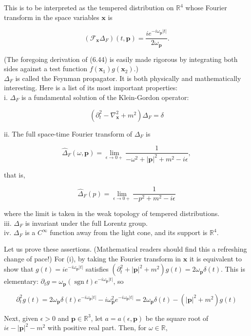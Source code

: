 \documentclass[10pt, letterpaper]{article}
\begin{document}
This is to be interpreted as the tempered distribution on $\mathbb{R}^{4}$ whose Fourier transform in the space variables $\mathbf{x}$ is

$$
\left(\mathcal{F}_{\mathbf{x}} \Delta_{F}\right)(t, \mathbf{p})=\frac{i e^{-i \omega_{\mathbf{p}}|t|}}{2 \omega_{\mathbf{p}}} .
$$

(The foregoing derivation of (6.44) is easily made rigorous by integrating both sides against a test function $f\left(\mathbf{x}_{1}\right) g\left(\mathbf{x}_{2}\right)$.)\\
$\Delta_{F}$ is called the Feynman propagator. It is both physically and mathematically interesting. Here is a list of its most important properties:\\
i. $\Delta_{F}$ is a fundamental solution of the Klein-Gordon operator:

$$
\left(\partial_{t}^{2}-\nabla_{\mathbf{x}}^{2}+m^{2}\right) \Delta_{F}=\delta
$$

ii. The full space-time Fourier transform of $\Delta_{F}$ is

$$
\widehat{\Delta}_{F}(\omega, \mathbf{p})=\lim _{\epsilon \rightarrow 0+} \frac{1}{-\omega^{2}+|\mathbf{p}|^{2}+m^{2}-i \epsilon},
$$

that is,

$$
\widehat{\Delta}_{F}(p)=\lim _{\epsilon \rightarrow 0+} \frac{1}{-p^{2}+m^{2}-i \epsilon}
$$

where the limit is taken in the weak topology of tempered distributions.\\
iii. $\Delta_{F}$ is invariant under the full Lorentz group.\\
iv. $\Delta_{F}$ is a $C^{\infty}$ function away from the light cone, and its support is $\mathbb{R}^{4}$.

Let us prove these assertions. (Mathematical readers should find this a refreshing change of pace!) For (i), by taking the Fourier transform in $\mathbf{x}$ it is equivalent to show that $g(t)=i e^{-i \omega_{\mathbf{p}}|t|}$ satisfies $\left(\partial_{t}^{2}+|\mathbf{p}|^{2}+m^{2}\right) g(t)=2 \omega_{\mathbf{p}} \delta(t)$. This is elementary: $\partial_{t} g=\omega_{\mathbf{p}}(\operatorname{sgn} t) e^{-i \omega_{\mathbf{p}}|t|}$, so

$$
\partial_{t}^{2} g(t)=2 \omega_{\mathbf{p}} \delta(t) e^{-i \omega_{\mathbf{p}}|t|}-i \omega_{\mathbf{p}}^{2} e^{-i \omega_{\mathbf{p}}|t|}=2 \omega_{\mathbf{p}} \delta(t)-\left(|\mathbf{p}|^{2}+m^{2}\right) g(t)
$$

Next, given $\epsilon>0$ and $\mathbf{p} \in \mathbb{R}^{3}$, let $a=a(\epsilon, \mathbf{p})$ be the square root of $i \epsilon-|\mathbf{p}|^{2}-m^{2}$ with positive real part. Then, for $\omega \in \mathbb{R}$,
\end{document}
